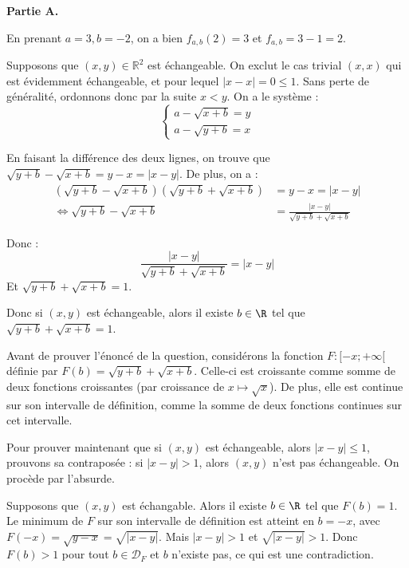 \documentclass[]{../../homework}
\begin{document}
\textbf{Partie A.}

\subproblem


	\subproblem
	En prenant $a = 3, b=-2$, on a bien $f_{a,b}(2) = 3$ et $f_{a,b} = 3-1 = 2$.
	\subproblem
	
	Supposons que $(x,y) \in \mathbb R^2$ est échangeable. On exclut le cas trivial $(x,x)$ qui est évidemment échangeable, et pour lequel $|x-x| = 0 \leq 1$. Sans perte de généralité, ordonnons donc par la suite $x < y$. On a le système :
	\begin{equation*}
		\begin{cases}
			a - \sqrt{x+b} = y \\
			a - \sqrt{y+b} = x
		\end{cases}
	\end{equation*}
	
	En faisant la différence des deux lignes, on trouve que $\sqrt{y+b} - \sqrt{x+b} = y-x = |x-y|$. De plus, on a :
	\begin{equation*}
		\begin{split}
		(\sqrt{y+b} - \sqrt{x+b})(\sqrt{y+b} + \sqrt{x+b}) &=y-x = |x-y| \\
		 \iff \sqrt{y+b} - \sqrt{x+b} &= \frac {|x-y|}{\sqrt{y+b} + \sqrt{x+b}} 
		 \end{split}
	\end{equation*}
	
	Donc : $$\frac {|x-y|}{\sqrt{y+b} + \sqrt{x+b}} = |x-y|$$
	Et $\sqrt{y+b} + \sqrt{x+b} = 1$.
	
	Donc si $(x,y)$ est échangeable, alors il existe $b\in\R$ tel que $\sqrt{y+b} + \sqrt{x+b} = 1$.
	
	Avant de prouver l'énoncé de la question, considérons la fonction $F: [-x;+\infty[$ définie par $F(b) = \sqrt{y+b} + \sqrt{x+b}$. Celle-ci est croissante comme somme de deux fonctions croissantes (par croissance de $x\mapsto \sqrt x$). De plus, elle est continue sur son intervalle de définition, comme la somme de deux fonctions continues sur cet intervalle.

	Pour prouver maintenant que si $(x,y)$ est échangeable, alors $|x-y| \leq 1$, prouvons sa contraposée : si $|x-y| > 1$, alors $(x,y)$ n'est pas échangeable. On procède par l'absurde.
	
	Supposons que $(x,y)$ est échangable. Alors il existe $b\in\R$ tel que $F(b) = 1$. Le minimum de $F$ sur son intervalle de définition est atteint en $b=-x$, avec $F(-x) = \sqrt{y-x} = \sqrt{|x-y|}$. Mais $|x-y| > 1$ et $\sqrt{|x-y|} > 1$. Donc $F(b) > 1$ pour tout $b\in \mathcal D_F$ et $b$ n'existe pas, ce qui est une contradiction.
	
\end{document}
